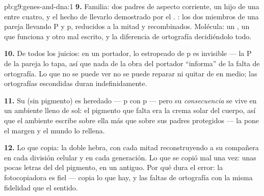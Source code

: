 \begin{solution}{pb:g9:genes-and-dna:1}
\textbf{9.} Familia: dos padres de aspecto corriente, un hijo de una
entre cuatro, y el hecho de llevarlo demostrado por el .
: los dos miembros de una pareja llevando P y p, reducidos a
la mitad y recombinados. Molécula: un , un  que funciona y otro
mal escrito, y la diferencia de ortografía decidiéndolo todo.

\textbf{10.} De todos los juicios: en un portador, lo estropeado de p
es invisible --- la P de la pareja lo tapa, así que nada de la obra del
portador ``informa'' de la falta de ortografía. Lo que no se puede ver
no se puede reparar ni quitar de en medio; las ortografías escondidas
duran indefinidamente.

\textbf{11.} Su  (sin pigmento) es heredado --- p con p --- pero
su \emph{consecuencia} se vive en un ambiente lleno de sol: el pigmento
que falta era la crema solar del cuerpo, así que el ambiente escribe
sobre ella más que sobre sus padres protegidos --- la  pone el
margen y el mundo lo rellena.

\textbf{12.} Lo que copia: la doble hebra, con cada mitad
reconstruyendo a su compañera en cada división celular y en cada
generación. Lo que se copió mal una vez: unas pocas letras del  del
pigmento, en un  antiguo. Por qué dura el error: la fotocopiadora
es fiel --- copia lo que hay, y las faltas de ortografía con la misma
fidelidad que el sentido.
\end{solution}
